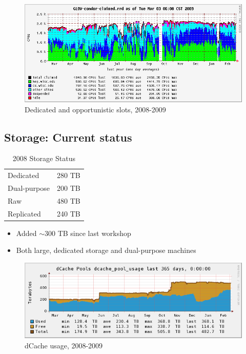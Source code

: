 \documentclass{beamer}
\newcommand{\ca}{\ensuremath{\sim}}
\begin{document}
\begin{frame}
\begin{figure}
    \includegraphics[width=\textwidth]{Graphics/GLOW-condor-claimed-1yr.png}
    \caption{Dedicated and opportunistic slots, 2008-2009}
\end{figure}
\end{frame}

\subsection{Storage: Current status}
\begin{frame}
\begin{table}
\begin{tabular}{lr}
    \toprule
    Dedicated       &   280 TB \\   %
    Dual-purpose    &   200 TB \\   %
    \midrule
    Raw             &   480 TB \\
    Replicated      &   240 TB \\
    \bottomrule
\end{tabular}
\caption{2008 Storage Status}
\label{2008_storage_status}
\end{table}

\begin{itemize}
    \item Added \ca{}300 TB since last workshop
    \item Both large, dedicated storage and dual-purpose machines
\end{itemize}
\end{frame}

\begin{frame}
\begin{figure}
    \includegraphics[width=\textwidth]{Graphics/dcache-usage-1yr.png}
    \caption{dCache usage, 2008-2009}
\end{figure}
\end{frame}
\end{document}
